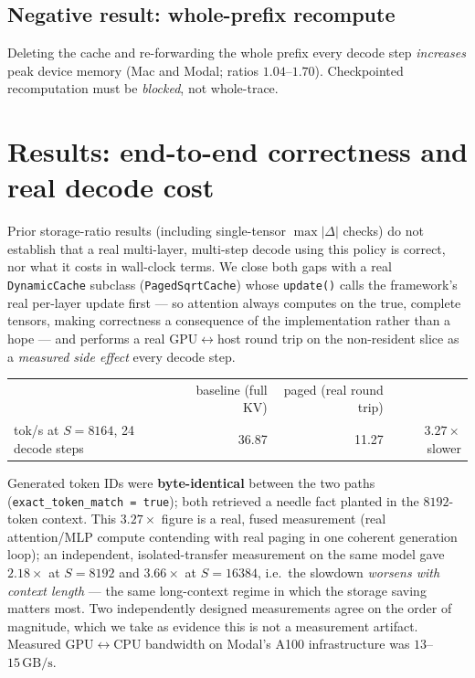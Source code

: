 \documentclass[11pt]{article}
\begin{document}
\subsection{Negative result: whole-prefix recompute}
Deleting the cache and re-forwarding the whole prefix every decode step
\emph{increases} peak device memory (Mac and Modal; ratios $1.04$--$1.70$).
Checkpointed recomputation must be \emph{blocked}, not whole-trace.

\section{Results: end-to-end correctness and real decode cost}
\label{sec:e2e}

Prior storage-ratio results (including single-tensor $\max|\Delta|$ checks)
do not establish that a real multi-layer, multi-step decode using this
policy is correct, nor what it costs in wall-clock terms. We close both
gaps with a real \texttt{DynamicCache} subclass (\texttt{PagedSqrtCache})
whose \texttt{update()} calls the framework's real per-layer update first
--- so attention always computes on the true, complete tensors, making
correctness a consequence of the implementation rather than a hope --- and
performs a real GPU$\leftrightarrow$host round trip on the non-resident
slice as a \emph{measured side effect} every decode step.

\begin{center}
\begin{tabular}{@{}lrrr@{}}
\toprule
& baseline (full KV) & paged (real round trip) & \\
tok/s at $S{=}8164$, 24 decode steps & 36.87 & 11.27 & $3.27\times$ slower \\
\bottomrule
\end{tabular}
\end{center}
Generated token IDs were \textbf{byte-identical} between the two paths
(\texttt{exact\_token\_match = true}); both retrieved a needle fact planted
in the $8192$-token context. This $3.27\times$ figure is a real, fused
measurement (real attention/MLP compute contending with real paging in one
coherent generation loop); an independent, isolated-transfer measurement on
the same model gave $2.18\times$ at $S{=}8192$ and $3.66\times$ at
$S{=}16384$, i.e.\ the slowdown \emph{worsens with context length} --- the
same long-context regime in which the storage saving matters most. Two
independently designed measurements agree on the order of magnitude, which
we take as evidence this is not a measurement artifact. Measured
GPU$\leftrightarrow$CPU bandwidth on Modal's A100 infrastructure was
$13$--$15\,\mathrm{GB/s}$.
\end{document}
